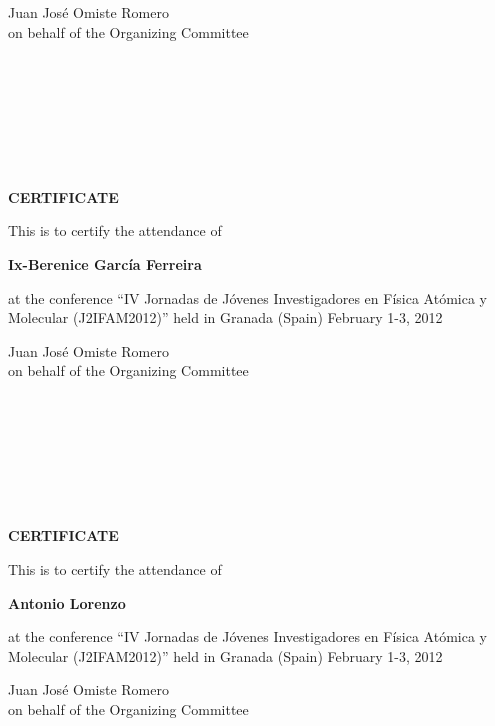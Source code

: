 \documentclass [13pt,a4paper] {letter}
\begin{document}
\vspace {4cm}
\begin{raggedleft}
Juan José Omiste Romero\\
on behalf of the Organizing Committee
\newpage
\end{raggedleft}
\begin{verbatim}







\end{verbatim}
\pagestyle{empty}
\begin{center}
{\bf {\Huge CERTIFICATE}}

\vspace {1.5cm}
This is to certify the attendance of
\vspace {1cm}

{\bf \Large  Ix-Berenice    García Ferreira }
\vspace {1cm}

at the conference { \textquotedblleft IV Jornadas de Jóvenes Investigadores en Física Atómica y Molecular (J2IFAM2012)\textquotedblright} 
held in Granada (Spain) February 1-3, 2012
\end{center}
\vspace {4cm}
\begin{raggedleft}
Juan José Omiste Romero\\
on behalf of the Organizing Committee
\newpage
\end{raggedleft}
\begin{verbatim}







\end{verbatim}
\pagestyle{empty}
\begin{center}
{\bf {\Huge CERTIFICATE}}

\vspace {1.5cm}
This is to certify the attendance of
\vspace {1cm}

{\bf \Large  Antonio    Lorenzo }
\vspace {1cm}

at the conference { \textquotedblleft IV Jornadas de Jóvenes Investigadores en Física Atómica y Molecular (J2IFAM2012)\textquotedblright} 
held in Granada (Spain) February 1-3, 2012
\end{center}
\vspace {4cm}
\begin{raggedleft}
Juan José Omiste Romero\\
on behalf of the Organizing Committee
\newpage
\end{raggedleft}
\end{document}
